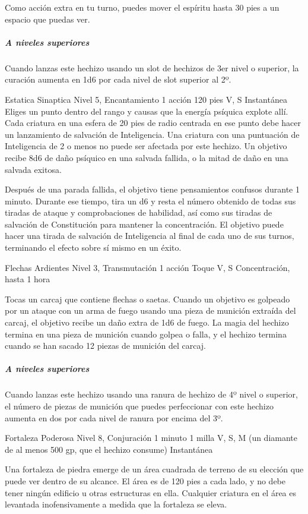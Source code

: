 \documentclass[a4paper,twocolumn,openany,10pt]{dndbook}
\begin{document}
	Como acción extra en tu turno, puedes mover el espíritu hasta 30 pies a un espacio que puedas ver.

	\subparagraph{A niveles superiores} Cuando lanzas este hechizo usando un slot de hechizos de 3er nivel o superior, la
	curación aumenta en 1d6 por cada nivel de slot superior al 2º. 

\spellheader%
	{Estatica Sinaptica}
	{Nivel 5, Encantamiento}
	{1 acción}
	{120 pies}
	{V, S}
	{Instantánea}
	Eliges un punto dentro del rango y causas que la energía psíquica explote allí. Cada criatura en una esfera de 20 pies de
	radio centrada en ese punto debe hacer un lanzamiento de salvación de Inteligencia. Una criatura con una puntuación de
	Inteligencia de 2 o menos no puede ser afectada por este hechizo. Un objetivo recibe 8d6 de daño psíquico en una salvada
	fallida, o la mitad de daño en una salvada exitosa.
	
	Después de una parada fallida, el objetivo tiene pensamientos confusos durante 1 minuto. Durante ese tiempo, tira un d6 y
	resta el número obtenido de todas sus tiradas de ataque y comprobaciones de habilidad, así como sus tiradas de salvación de
	Constitución para mantener la concentración. El objetivo puede hacer una tirada de salvación de Inteligencia al final de
	cada uno de sus turnos, terminando el efecto sobre sí mismo en un éxito. 

\spellheader%
	{Flechas Ardientes}
	{Nivel 3, Transmutación}
	{1 acción}
	{Toque}
	{V, S}
	{Concentración, hasta 1 hora}
	
	Tocas un carcaj que contiene flechas o saetas. Cuando un objetivo es golpeado por un ataque con un arma de fuego usando una
	pieza de munición extraída del carcaj, el objetivo recibe un daño extra de 1d6 de fuego. La magia del hechizo termina en una
	pieza de munición cuando golpea o falla, y el hechizo termina cuando se han sacado 12 piezas de munición del carcaj.

	\subparagraph{A niveles superiores} Cuando lanzas este hechizo usando una ranura de hechizo de 4º nivel o superior, el
	número de piezas de munición que puedes perfeccionar con este hechizo aumenta en dos por cada nivel de ranura por encima del
	3º. 

\spellheader%
	{Fortaleza Poderosa}
	{Nivel 8, Conjuración}
	{1 minuto}
	{1 milla}
	{V, S, M (un diamante de al menos 500 gp, que el hechizo consume)}
	{Instantánea}
	
	Una fortaleza de piedra emerge de un área cuadrada de terreno de su elección que puede ver dentro de su alcance. El área es
	de 120 pies a cada lado, y no debe tener ningún edificio u otras estructuras en ella. Cualquier criatura en el área es
	levantada inofensivamente a medida que la fortaleza se eleva.
	
\end{document}
